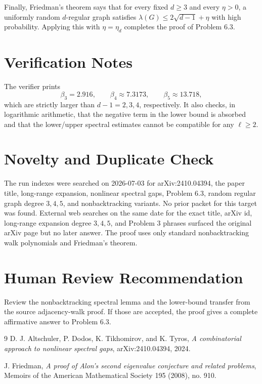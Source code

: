 \documentclass[11pt]{article}
\begin{document}
Finally, Friedman's theorem says that for every fixed $d\ge3$ and every
$\eta>0$, a uniformly random $d$-regular graph satisfies
$\lambda(G)\le2\sqrt{d-1}+\eta$ with high probability.  Applying this with
$\eta=\eta_d$ completes the proof of Problem 6.3.

\section*{Verification Notes}

The verifier prints
\[
  \beta_3=2.916,\qquad \beta_4\approx7.3173,\qquad
  \beta_5\approx13.718,
\]
which are strictly larger than $d-1=2,3,4$, respectively.  It also checks,
in logarithmic arithmetic, that the negative term in the lower bound is
absorbed and that the lower/upper spectral estimates cannot be compatible for
any $\ell\ge2$.

\section*{Novelty and Duplicate Check}

The run indexes were searched on 2026-07-03 for arXiv:2410.04394, the paper
title, long-range expansion, nonlinear spectral gaps, Problem 6.3, random
regular graph degree $3,4,5$, and nonbacktracking variants.  No prior packet
for this target was found.  External web searches on the same date for the
exact title, arXiv id, long-range expansion degree $3,4,5$, and Problem 3
phrases surfaced the original arXiv page but no later answer.  The proof uses
only standard nonbacktracking walk polynomials and Friedman's theorem.

\section*{Human Review Recommendation}

Review the nonbacktracking spectral lemma and the lower-bound transfer from
the source adjacency-walk proof.  If those are accepted, the proof gives a
complete affirmative answer to Problem 6.3.

\begin{thebibliography}{9}
D. J. Altschuler, P. Dodos, K. Tikhomirov, and K. Tyros,
\emph{A combinatorial approach to nonlinear spectral gaps},
arXiv:2410.04394, 2024.

J. Friedman,
\emph{A proof of Alon's second eigenvalue conjecture and related problems},
Memoirs of the American Mathematical Society 195 (2008), no. 910.
\end{thebibliography}
\end{document}
